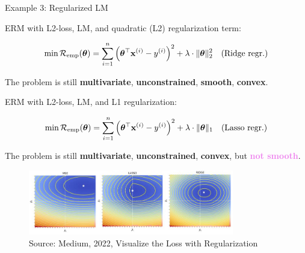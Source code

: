 \documentclass[11pt,compress,t,notes=noshow, xcolor=table]{beamer}
\begin{document}
\begin{vbframe}{Example 3: Regularized LM}

\begin{footnotesize}

ERM with L2-loss, LM, and quadratic (L2) regularization term: 

\vspace*{-0.2cm}

$$
	\min \mathcal{R}_{\text{emp}}(\bm{\theta}) = \sum\limits_{i=1}^n \left(\bm{\theta}^\top \mathbf{x}^{(i)} - y^{(i)}\right)^2  + \lambda \cdot \|\bm{\theta}\|_2^2 \quad \text{(Ridge regr.)}
$$

\vspace*{-0.1cm}


The problem is still \textbf{multivariate}, \textbf{unconstrained}, \textbf{smooth}, \textbf{convex}.

\vspace*{0.1cm}

ERM with L2-loss, LM, and L1 regularization: 

\vspace*{-0.2cm}

$$
	\min \mathcal{R}_{\text{emp}}(\bm{\theta}) = \sum\limits_{i=1}^n \left(\bm{\theta}^\top \mathbf{x}^{(i)} - y^{(i)}\right)^2  + \lambda \cdot \|\bm{\theta}\|_1 \quad \text{(Lasso regr.)}
$$

\vspace*{-0.1cm}

The problem is still \textbf{multivariate}, \textbf{unconstrained}, \textbf{convex}, but \textcolor{violet}{\textbf{not smooth}}. %

\vspace*{-0.3cm}

\begin{figure}
\begin{center}
	\includegraphics[width=0.8\textwidth]{figure_man/lasso-ridge_medium.jpg}
\end{center}
	\caption{Source: Medium, 2022, Visualize the Loss with Regularization}
\end{figure}

\end{footnotesize}

\end{vbframe}
\end{document}
